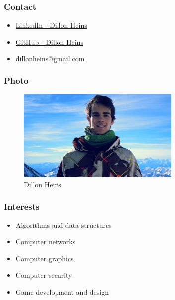 \documentclass{article}
\begin{document}
	\subsubsection{Contact}
		\begin{itemize}
			\item \href{https://za.linkedin.com/in/dillon-heins-54275810a}{LinkedIn - Dillon Heins}
			\item \href{https://github.com/DillonHeins}{GitHub - Dillon Heins}
			\item \href{mailto:dillonheins@gmail.com}{dillonheins@gmail.com}
		\end{itemize}
	\subsubsection{Photo}
		\begin{figure}[H]
			\centering
			\includegraphics[width=0.7\textwidth]{../dillon.jpg}
			\caption{Dillon Heins}
		\end{figure}
	\subsubsection{Interests}
		\begin{itemize}
			\item Algorithms and data structures
			\item Computer networks
			\item Computer graphics
			\item Computer security
			\item Game development and design
		\end{itemize}
\end{document}

